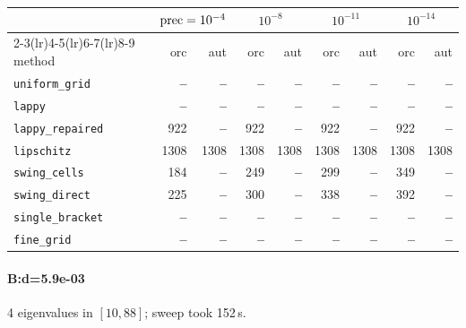 \begin{center}
\small
\begin{tabular}{lrrrrrrrr}
\toprule
& \multicolumn{2}{c}{$\mathrm{prec}=10^{-4}$} & \multicolumn{2}{c}{$10^{-8}$} & \multicolumn{2}{c}{$10^{-11}$} & \multicolumn{2}{c}{$10^{-14}$} \\
\cmidrule(lr){2-3}\cmidrule(lr){4-5}\cmidrule(lr){6-7}\cmidrule(lr){8-9}
method & orc & aut & orc & aut & orc & aut & orc & aut \\
\midrule
\texttt{uniform\_grid} & \textbf{--} & \textbf{--} & \textbf{--} & \textbf{--} & \textbf{--} & \textbf{--} & \textbf{--} & \textbf{--} \\
\texttt{lappy} & \textbf{--} & \textbf{--} & \textbf{--} & \textbf{--} & \textbf{--} & \textbf{--} & \textbf{--} & \textbf{--} \\
\texttt{lappy\_repaired} & 922 & \textbf{--} & 922 & \textbf{--} & 922 & \textbf{--} & 922 & \textbf{--} \\
\texttt{lipschitz} & 1308 & 1308 & 1308 & 1308 & 1308 & 1308 & 1308 & 1308 \\
\texttt{swing\_cells} & 184 & \textbf{--} & 249 & \textbf{--} & 299 & \textbf{--} & 349 & \textbf{--} \\
\texttt{swing\_direct} & 225 & \textbf{--} & 300 & \textbf{--} & 338 & \textbf{--} & 392 & \textbf{--} \\
\midrule
\texttt{single\_bracket} & \textbf{--} & \textbf{--} & \textbf{--} & \textbf{--} & \textbf{--} & \textbf{--} & \textbf{--} & \textbf{--} \\
\texttt{fine\_grid} & \textbf{--} & \textbf{--} & \textbf{--} & \textbf{--} & \textbf{--} & \textbf{--} & \textbf{--} & \textbf{--} \\
\bottomrule
\end{tabular}
\end{center}

\paragraph{B:d=5.9e-03} 4 eigenvalues in $[10, 88]$; sweep took 152\,s.

